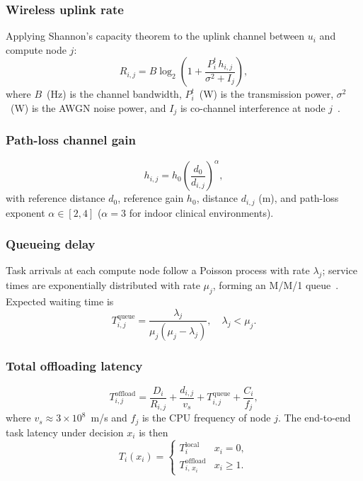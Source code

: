 \documentclass[journal]{IEEEtran}
\begin{document}
\subsubsection{Wireless uplink rate}
Applying Shannon's capacity theorem to the uplink channel between $u_i$
and compute node $j$:
\begin{equation}
  R_{i,j} = B \log_2\!\left(1 + \frac{P^t_i \, h_{i,j}}{\sigma^2 + I_j}\right),
  \label{eq:shannon_rate}
\end{equation}
where $B$~(Hz) is the channel bandwidth, $P^t_i$~(W) is the
transmission power, $\sigma^2$~(W) is the AWGN noise power, and $I_j$
is co-channel interference at node $j$~\cite{rappaport2002}.

\subsubsection{Path-loss channel gain}
\begin{equation}
  h_{i,j} = h_0 \left(\frac{d_0}{d_{i,j}}\right)^{\!\alpha},
  \label{eq:channel_gain}
\end{equation}
with reference distance $d_0$, reference gain $h_0$, distance $d_{i,j}$
(m), and path-loss exponent $\alpha \in [2,4]$ ($\alpha=3$ for indoor
clinical environments).

\subsubsection{Queueing delay}
Task arrivals at each compute node follow a Poisson process with rate
$\lambda_j$; service times are exponentially distributed with rate
$\mu_j$, forming an M/M/1 queue~\cite{kleinrock1975}. Expected waiting
time is
\begin{equation}
  T^{\mathrm{queue}}_{i,j} = \frac{\lambda_j}{\mu_j(\mu_j - \lambda_j)},
  \quad \lambda_j < \mu_j.
  \label{eq:queue_delay}
\end{equation}

\subsubsection{Total offloading latency}
\begin{equation}
  T^{\mathrm{offload}}_{i,j} =
    \frac{D_i}{R_{i,j}}
    + \frac{d_{i,j}}{v_s}
    + T^{\mathrm{queue}}_{i,j}
    + \frac{C_i}{f_j},
  \label{eq:latency_offload}
\end{equation}
where $v_s \approx 3\times10^8$~m/s and $f_j$ is the CPU frequency of
node $j$. The end-to-end task latency under decision $x_i$ is then
\begin{equation}
  T_i(x_i) =
  \begin{cases}
    T^{\mathrm{local}}_i            & x_i = 0, \\[3pt]
    T^{\mathrm{offload}}_{i,\,x_i} & x_i \geq 1.
  \end{cases}
  \label{eq:latency_total}
\end{equation}
\end{document}
